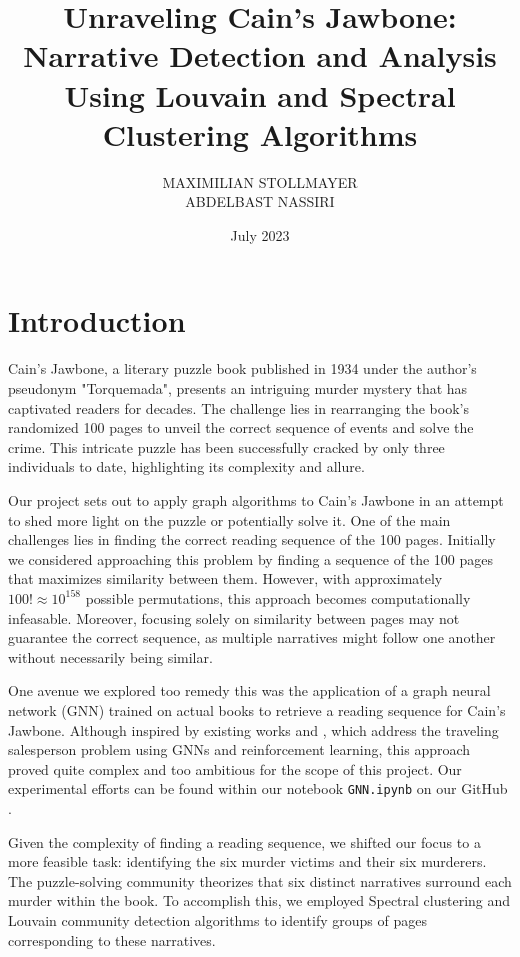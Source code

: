 \documentclass[a4paper]{article}
\title{Unraveling Cain's Jawbone: Narrative Detection and Analysis Using Louvain and Spectral Clustering Algorithms}
\author{MAXIMILIAN STOLLMAYER \\ 
ABDELBAST NASSIRI}
\date{July 2023}
\begin{document}
\maketitle

\section{Introduction}

Cain's Jawbone, a literary puzzle book published in 1934 under the author's pseudonym "Torquemada", presents an intriguing murder mystery that has captivated readers for decades. The challenge lies in rearranging the book's randomized 100 pages to unveil the correct sequence of events and solve the crime. This intricate puzzle has been successfully cracked by only three individuals to date, highlighting its complexity and allure.

Our project sets out to apply graph algorithms to Cain's Jawbone in an attempt to shed more light on the puzzle or potentially solve it. One of the main challenges lies in finding the correct reading sequence of the 100 pages. Initially we considered approaching this problem by finding a sequence of the 100 pages that maximizes similarity between them. However, with approximately $100! \approx 10^{158}$ possible permutations, this approach becomes computationally infeasable. Moreover, focusing solely on similarity between pages may not guarantee the correct sequence, as multiple narratives might follow one another without necessarily being similar.

One avenue we explored too remedy this was the application of a graph neural network (GNN) trained on actual books to retrieve a reading sequence for Cain's Jawbone. Although inspired by existing works \cite{GNN1} and \cite{GNN2}, which address the traveling salesperson problem using GNNs and reinforcement learning, this approach proved quite complex and too ambitious for the scope of this project. Our experimental efforts can be found within our notebook \verb|GNN.ipynb| on our GitHub \cite{github}.

Given the complexity of finding a reading sequence, we shifted our focus to a more feasible task: identifying the six murder victims and their six murderers. The puzzle-solving community theorizes that six distinct narratives surround each murder within the book. To accomplish this, we employed Spectral clustering and Louvain community detection algorithms to identify groups of pages corresponding to these narratives.
\end{document}
